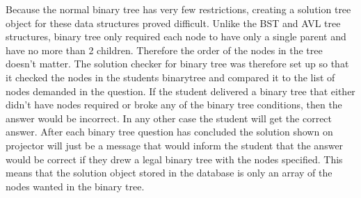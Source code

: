 Because the normal binary tree has very few restrictions, creating a solution tree object for these data structures proved difficult. Unlike the BST and AVL tree structures, binary tree only required each node to have only a single parent and have no more than 2 children. Therefore the order of the nodes in the tree doesn't matter. The solution checker for binary tree was therefore set up so that it checked the nodes in the students binarytree and compared it to the list of nodes demanded in the question. If the student delivered a binary tree that either didn't have nodes required or broke any of the binary tree conditions, then the answer would be incorrect. In any other case the student will get the correct answer. After each binary tree question has concluded the solution shown on projector will just be a message that would inform the student that the answer would be correct if they drew a legal binary tree with the nodes specified. This means that the solution object stored in the database is only an array of the nodes wanted in the binary tree.